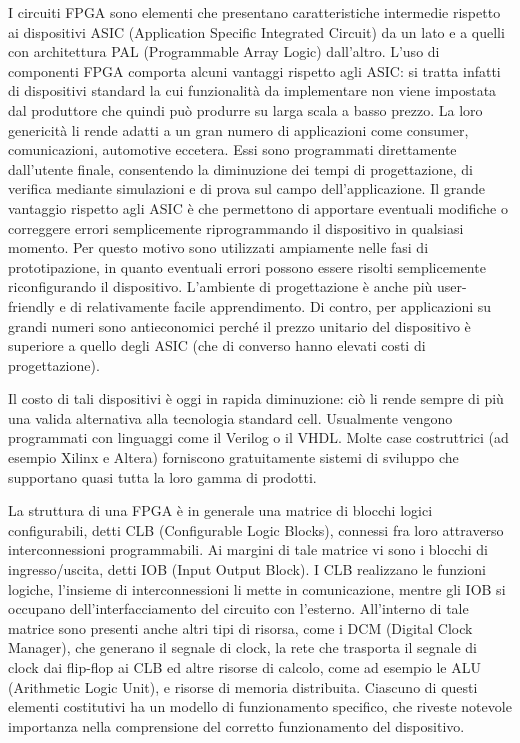 \documentclass[a4paper,titlepage]{book}
\begin{document}
I circuiti FPGA sono elementi che presentano caratteristiche intermedie rispetto ai dispositivi ASIC (Application Specific Integrated Circuit) da un lato e a quelli con architettura PAL (Programmable Array Logic) dall'altro. L'uso di componenti FPGA comporta alcuni vantaggi rispetto agli ASIC: si tratta infatti di dispositivi standard la cui funzionalità da implementare non viene impostata dal produttore che quindi può produrre su larga scala a basso prezzo. La loro genericità li rende adatti a un gran numero di applicazioni come consumer, comunicazioni, automotive eccetera. Essi sono programmati direttamente dall'utente finale, consentendo la diminuzione dei tempi di progettazione, di verifica mediante simulazioni e di prova sul campo dell'applicazione. Il grande vantaggio rispetto agli ASIC è che permettono di apportare eventuali modifiche o correggere errori semplicemente riprogrammando il dispositivo in qualsiasi momento. Per questo motivo sono utilizzati ampiamente nelle fasi di prototipazione, in quanto eventuali errori possono essere risolti semplicemente riconfigurando il dispositivo. L'ambiente di progettazione è anche più user-friendly e di relativamente facile apprendimento. Di contro, per applicazioni su grandi numeri sono antieconomici perché il prezzo unitario del dispositivo è superiore a quello degli ASIC (che di converso hanno elevati costi di progettazione).

Il costo di tali dispositivi è oggi in rapida diminuzione: ciò li rende sempre di più una valida alternativa alla tecnologia standard cell. Usualmente vengono programmati con linguaggi come il Verilog o il VHDL. Molte case costruttrici (ad esempio Xilinx e Altera) forniscono gratuitamente sistemi di sviluppo che supportano quasi tutta la loro gamma di prodotti.

La struttura di una FPGA è in generale una matrice di blocchi logici configurabili, detti CLB (Configurable Logic Blocks), connessi fra loro attraverso interconnessioni programmabili. Ai margini di tale matrice vi sono i blocchi di ingresso/uscita, detti IOB (Input Output Block). I CLB realizzano le funzioni logiche, l'insieme di interconnessioni li mette in comunicazione, mentre gli IOB si occupano dell'interfacciamento del circuito con l'esterno. All'interno di tale matrice sono presenti anche altri tipi di risorsa, come i DCM (Digital Clock Manager), che generano il segnale di clock, la rete che trasporta il segnale di clock dai flip-flop ai CLB ed altre risorse di calcolo, come ad esempio le ALU (Arithmetic Logic Unit), e risorse di memoria distribuita. Ciascuno di questi elementi costitutivi ha un modello di funzionamento specifico, che riveste notevole importanza nella comprensione del corretto funzionamento del dispositivo.
\end{document}
